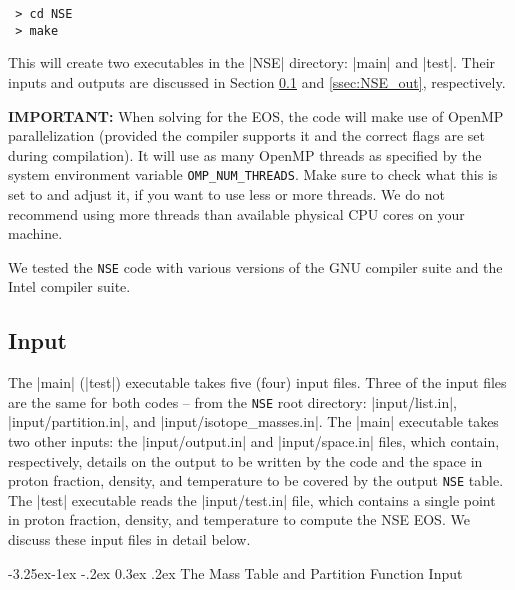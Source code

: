 \documentclass[letterpaper,11pt]{refart}
\makeatletter
\renewcommand\subsubsection{\@startsection{subsubsection}{3}{\z@}%
                           {-3.25ex\@plus -1ex \@minus -.2ex}%
                           {0.3ex \@plus .2ex}%
                           {\normalfont\normalsize\bf\fontsize{11}{13}\selectfont}}
\makeatother
\begin{document}
\begin{verbatim}
 > cd NSE
 > make
\end{verbatim}


This will create two executables in the
\verbfile|NSE| directory: \verbexec|main| and \verbexec|test|.  
Their inputs and outputs are discussed in Section \ref{ssec:NSE_in}
and \ref{ssec:NSE_out}, respectively.

\textbf{IMPORTANT:} When solving for the EOS, the code will make use
of OpenMP parallelization (provided the compiler supports it and the
correct flags are set during compilation). It will use as many OpenMP threads as
specified by the system environment variable
\texttt{OMP\_NUM\_THREADS}. Make sure to check what this is set to and
adjust it, if you want to use less or more threads. We do not
recommend using more threads than available physical CPU cores on your
machine.

We tested the \texttt{NSE} code with various versions of the GNU
compiler suite and the Intel compiler suite.





\subsection{Input}\label{ssec:NSE_in}


The \verbexec|main| (\verbexec|test|) executable takes five (four)
input files.  Three of the input files are the same for both codes --
from the \texttt{\color{red}NSE} root directory:
\verbfile|input/list.in|, \verbfile|input/partition.in|, and
\verbfile|input/isotope_masses.in|.  The \verbexec|main| executable 
takes two other inputs: the \verbfile|input/output.in|
and \verbfile|input/space.in| files, which contain,
respectively, details on the output to be written by the code and the
space in proton fraction, density, and temperature to be covered by
the output \texttt{NSE} table.  The \verbexec|test| executable reads
the \verbfile|input/test.in| file, which contains a single point in
proton fraction, density, and temperature to compute the NSE EOS.  We
discuss these input files in detail below.




\subsubsection{The Mass Table and Partition Function Input}
\label{sssec:mass_table.in}
\end{document}

